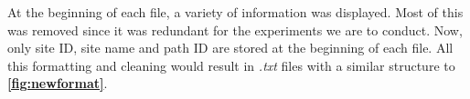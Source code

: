 
At the beginning of each file, a variety of information was displayed. Most of this was removed since it was redundant for the experiments we are to conduct. Now, only site ID, site name and path ID are stored at the beginning of each file. All this formatting and cleaning would result in \textit{.txt} files with a similar structure to \textbf{\autoref{fig:newformat}}.


